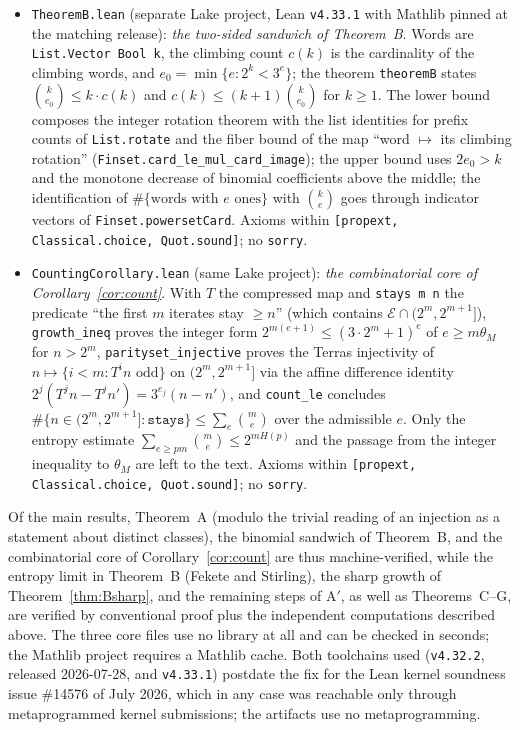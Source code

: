 \documentclass[11pt]{article}
\theoremstyle{definition}
\begin{document}
\begin{itemize}
  uses). Axioms within \texttt{[propext, Classical.choice,
  Quot.sound]}.
\item \texttt{TheoremB.lean} (separate Lake project, Lean
  \texttt{v4.33.1} with Mathlib pinned at the matching release):
  \emph{the two-sided sandwich of Theorem~B}. Words are
  \texttt{List.Vector Bool k}, the
  climbing count $c(k)$ is the cardinality of the climbing words, and
  $e_0=\min\{e: 2^k<3^e\}$; the theorem \texttt{theoremB} states
  $\binom{k}{e_0}\le k\cdot c(k)$ and $c(k)\le (k+1)\binom{k}{e_0}$ for
  $k\ge 1$. The lower bound composes the integer rotation theorem with
  the list identities for prefix counts of \texttt{List.rotate} and the
  fiber bound of the map ``word $\mapsto$ its climbing rotation''
  (\texttt{Finset.card\_le\_mul\_card\_image}); the upper bound uses
  $2e_0>k$ and the monotone decrease of binomial coefficients above the
  middle; the identification of $\#\{\text{words with } e \text{ ones}\}$
  with $\binom{k}{e}$ goes through indicator vectors of
  \texttt{Finset.powersetCard}. Axioms within \texttt{[propext,
  Classical.choice, Quot.sound]}; no \texttt{sorry}.
\item \texttt{CountingCorollary.lean} (same Lake project): \emph{the
  combinatorial core of Corollary~\ref{cor:count}}. With $T$ the
  compressed map and \texttt{stays m n} the predicate ``the first $m$
  iterates stay $\ge n$'' (which contains $\mathcal{E}\cap(2^m,2^{m+1}]$),
  \texttt{growth\_ineq} proves the integer form
  $2^{m(e+1)}\le(3\cdot 2^m+1)^e$ of $e\ge m\theta_M$ for $n>2^m$,
  \texttt{parityset\_injective} proves the Terras injectivity of
  $n\mapsto\{i<m: T^i n \text{ odd}\}$ on $(2^m,2^{m+1}]$ via the affine
  difference identity $2^j(T^jn-T^jn')=3^{e_j}(n-n')$, and
  \texttt{count\_le} concludes
  $\#\{n\in(2^m,2^{m+1}]:\texttt{stays}\}\le\sum_{e}\binom{m}{e}$ over the
  admissible $e$. Only the entropy estimate
  $\sum_{e\ge pm}\binom me\le 2^{mH(p)}$ and the passage from the integer
  inequality to $\theta_M$ are left to the text. Axioms within
  \texttt{[propext, Classical.choice, Quot.sound]}; no \texttt{sorry}.
\end{itemize}
Of the main results, Theorem~A (modulo the trivial reading of an
injection as a statement about distinct classes), the binomial
sandwich of Theorem~B, and the combinatorial core of
Corollary~\ref{cor:count} are thus machine-verified, while the entropy limit
in Theorem~B (Fekete and Stirling), the sharp growth of
Theorem~\ref{thm:Bsharp}, and the remaining steps of A$'$, as
well as Theorems~C--G, are verified by conventional proof plus the
independent computations described above. The three core files use no
library at all and can be checked in seconds; the Mathlib project requires
a Mathlib cache. Both toolchains used (\texttt{v4.32.2}, released
2026-07-28, and \texttt{v4.33.1}) postdate the fix for the Lean kernel
soundness issue \#14576 of July 2026, which in any case was reachable only
through metaprogrammed kernel submissions; the artifacts use no
metaprogramming.
\end{document}
